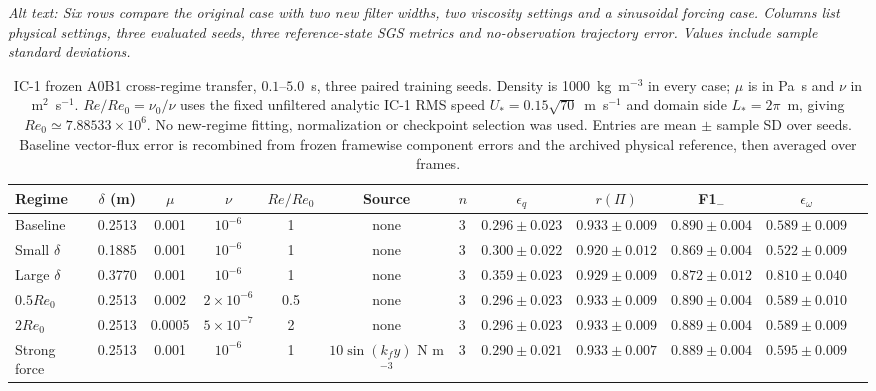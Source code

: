 
\begin{landscape}
\begin{table}[p]\centering\scriptsize
\caption{IC-1 frozen A0B1 cross-regime transfer, $0.1$--$5.0$~s, three paired training seeds. Density is 1000~kg~m$^{-3}$ in every case; $\mu$ is in Pa~s and $\nu$ in m$^2$~s$^{-1}$. $Re/Re_0=\nu_0/\nu$ uses the fixed unfiltered analytic IC-1 RMS speed $U_*=0.15\sqrt{70}$~m~s$^{-1}$ and domain side $L_*=2\pi$~m, giving $Re_0\simeq7.88533\times10^6$. No new-regime fitting, normalization or checkpoint selection was used. Entries are mean $\pm$ sample SD over seeds. Baseline vector-flux error is recombined from frozen framewise component errors and the archived physical reference, then averaged over frames.\label{tab:cross_regime}}
\par\smallskip\noindent\textit{Alt text: Six rows compare the original case with two new filter widths, two viscosity settings and a sinusoidal forcing case. Columns list physical settings, three evaluated seeds, three reference-state SGS metrics and no-observation trajectory error. Values include sample standard deviations.}
\begin{tabular}{lccccclccccc}\toprule
Regime & $\delta$ (m) & $\mu$ & $\nu$ & $Re/Re_0$ & Source & $n$ & $\epsilon_q$ & $r(\Pi)$ & F1$_-$ & $\epsilon_\omega$ \\\midrule
Baseline & 0.2513 & 0.001 & $10^{-6}$ & 1 & none & 3 & $0.296\pm0.023$ & $0.933\pm0.009$ & $0.890\pm0.004$ & $0.589\pm0.009$ \\
Small $\delta$ & 0.1885 & 0.001 & $10^{-6}$ & 1 & none & 3 & $0.300\pm0.022$ & $0.920\pm0.012$ & $0.869\pm0.004$ & $0.522\pm0.009$ \\
Large $\delta$ & 0.3770 & 0.001 & $10^{-6}$ & 1 & none & 3 & $0.359\pm0.023$ & $0.929\pm0.009$ & $0.872\pm0.012$ & $0.810\pm0.040$ \\
$0.5Re_0$ & 0.2513 & 0.002 & $2\times10^{-6}$ & 0.5 & none & 3 & $0.296\pm0.023$ & $0.933\pm0.009$ & $0.890\pm0.004$ & $0.589\pm0.010$ \\
$2Re_0$ & 0.2513 & 0.0005 & $5\times10^{-7}$ & 2 & none & 3 & $0.296\pm0.023$ & $0.933\pm0.009$ & $0.889\pm0.004$ & $0.589\pm0.009$ \\
Strong force & 0.2513 & 0.001 & $10^{-6}$ & 1 & $10\sin(k_f y)$ N m$^{-3}$ & 3 & $0.290\pm0.021$ & $0.933\pm0.007$ & $0.889\pm0.004$ & $0.595\pm0.009$ \\
\bottomrule\end{tabular}
\end{table}
\end{landscape}
